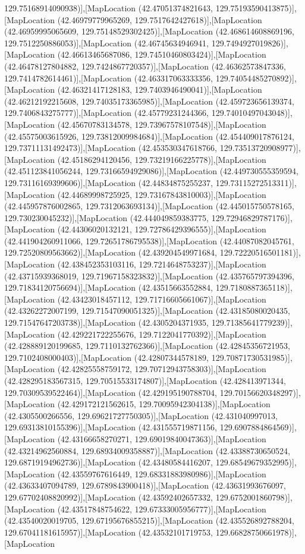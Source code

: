 129.75168914090938)],[MapLocation (42.47051374821643, 129.75193590413875)],[MapLocation (42.46979779965269, 129.7517642427618)],[MapLocation (42.46959995065609, 129.75148529302425)],[MapLocation (42.468614608869196, 129.7512250886053)],[MapLocation (42.46745634946941, 129.7494927019826)],[MapLocation (42.46613465687086, 129.74510460803424)],[MapLocation (42.46478127804882, 129.7424867720357)],[MapLocation (42.46362573847336, 129.7414782614461)],[MapLocation (42.463317063333356, 129.74054485270892)],[MapLocation (42.46321417128183, 129.7403946490041)],[MapLocation (42.46212192215608, 129.74035173365985)],[MapLocation (42.459723656139374, 129.7406843275777)],[MapLocation (42.45779231244366, 129.74010497043048)],[MapLocation (42.45670783134578, 129.73967578107548)],[MapLocation (42.45575003615926, 129.73812009984684)],[MapLocation (42.454409017876124, 129.73711131492473)],[MapLocation (42.453530347618766, 129.73513720908977)],[MapLocation (42.45186294120456, 129.73219166225778)],[MapLocation (42.451123841056244, 129.73166594929086)],[MapLocation (42.449730555359594, 129.73116169399606)],[MapLocation (42.44834875255237, 129.73115272513311)],[MapLocation (42.44689998725925, 129.73167843810003)],[MapLocation (42.445957876002865, 129.7312063693134)],[MapLocation (42.445015750578165, 129.730230045232)],[MapLocation (42.444049859383775, 129.72946829787176)],[MapLocation (42.44306020132121, 129.72786429396555)],[MapLocation (42.441904260911066, 129.72651786795538)],[MapLocation (42.44087082045761, 129.72520809563662)],[MapLocation (42.439204549971684, 129.72220516501181)],[MapLocation (42.438452353103116, 129.7214648753237)],[MapLocation (42.43715939368019, 129.71967158323832)],[MapLocation (42.435765797394396, 129.71834120756694)],[MapLocation (42.43515663552884, 129.7180887365118)],[MapLocation (42.43423018457112, 129.71716605661067)],[MapLocation (42.43262272007199, 129.71547090051325)],[MapLocation (42.43185080020435, 129.71547647203738)],[MapLocation (42.4305204371935, 129.71385641779239)],[MapLocation (42.429221722255676, 129.7122041770392)],[MapLocation (42.428889120199685, 129.7110132762366)],[MapLocation (42.42845356721953, 129.7102408000403)],[MapLocation (42.42807344578189, 129.70871730531985)],[MapLocation (42.42825558759172, 129.70712943758303)],[MapLocation (42.428295183567315, 129.70515533174807)],[MapLocation (42.428413971344, 129.70309539522464)],[MapLocation (42.429195190788704, 129.70156620348297)],[MapLocation (42.429172121562615, 129.70095942304138)],[MapLocation (42.4305500266556, 129.69621727750305)],[MapLocation (42.431040997013, 129.69313810155396)],[MapLocation (42.431555719871156, 129.6907884864569)],[MapLocation (42.43166658270271, 129.69019840047363)],[MapLocation (42.43214962560884, 129.68934009358887)],[MapLocation (42.43388730650524, 129.68719194962736)],[MapLocation (42.43480584416207, 129.68549679352995)],[MapLocation (42.43559767616449, 129.68331883980986)],[MapLocation (42.43633407094789, 129.6789843900418)],[MapLocation (42.43631993676097, 129.67702408820992)],[MapLocation (42.43592402657332, 129.6752001860798)],[MapLocation (42.43517848754622, 129.67333005956777)],[MapLocation (42.43540020019705, 129.67195676855215)],[MapLocation (42.435526892788204, 129.67041181615957)],[MapLocation (42.43532101719753, 129.66828750661978)],[MapLocation 